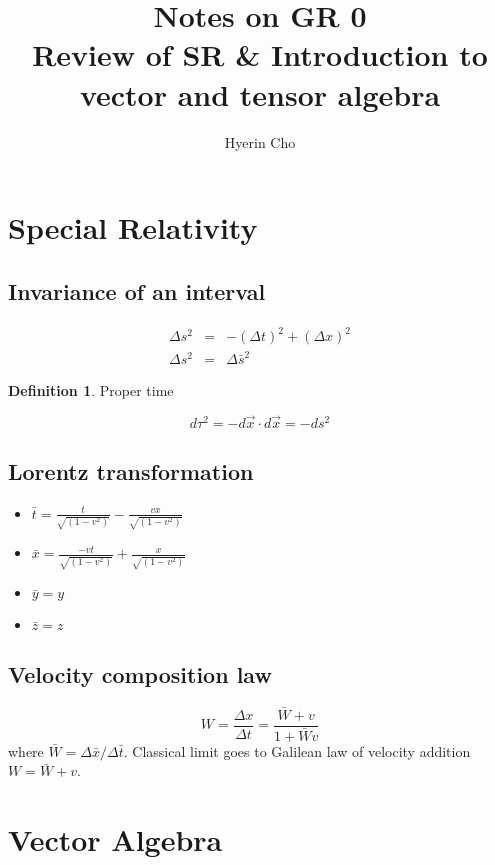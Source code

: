 \documentclass{article}
\title{Notes on GR 0 \\ Review of SR \& Introduction to vector and tensor algebra}
\author{Hyerin Cho}
\date{\vspace{-5ex}}
\theoremstyle{plain}
\theoremstyle{definition}
\newtheorem{defn}[thm]{Definition} %
\begin{document}
\maketitle

\section{Special Relativity} \label{sec:sr}

\subsection{Invariance of an interval}
\begin{eqnarray}
    \Delta s^2 & = & - (\Delta t)^2 + (\Delta x)^2\\
    \Delta s^2 & = & \Delta \bar{s}^2  
\end{eqnarray}

\begin{defn} Proper time \end{defn} \label{eq:tau}
\begin{equation}
    d\tau^2 = -d\vec{x} \cdot d\vec{x} = -ds^2
\end{equation}

\subsection{Lorentz transformation}
\begin{itemize}
  \item $\bar{t} = \frac{t}{\sqrt{(1-v^2)}} - \frac{v x}{\sqrt{(1-v^2)}}$
  \item $\bar{x} = \frac{-v t}{\sqrt{(1-v^2)}} + \frac{x}{\sqrt{(1-v^2)}}$
  \item $\bar{y} = y$
  \item $\bar{z} = z$
\end{itemize}

\subsection{Velocity composition law}

\begin{equation}
    W = \frac{\Delta x}{\Delta t} = \frac{\bar{W}+v}{1+\bar{W}v}
\end{equation}
where $\bar{W} = \Delta \bar{x} / \Delta \bar{t}$. Classical limit goes to Galilean law of velocity addition $W = \bar{W} + v$.

\section{Vector Algebra} \label{sec:va}
\end{document}
